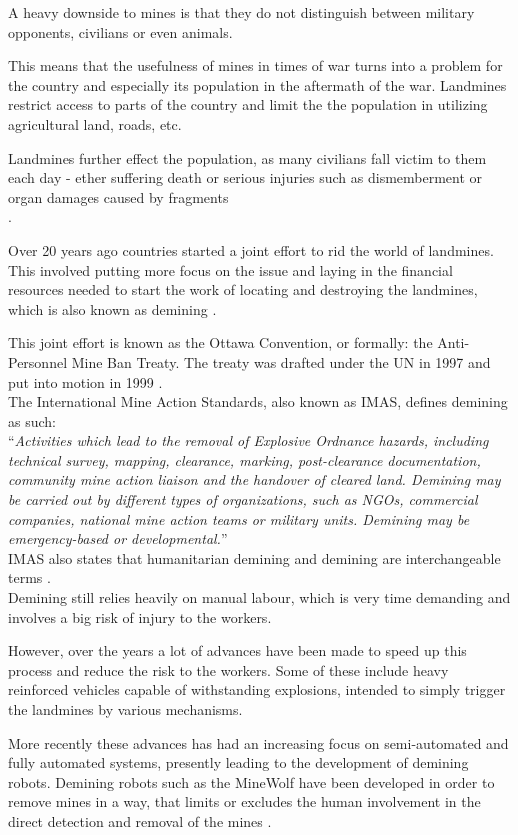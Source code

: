 A heavy downside to mines is that they do not distinguish between military opponents, civilians or even animals.

This means that the usefulness of mines in times of war turns into a problem for the country and especially its population in the aftermath of the war. Landmines restrict access to parts of the country and limit the the population in utilizing agricultural land, roads, etc.

Landmines further effect the population, as many civilians fall victim to them each day - ether suffering death or serious injuries such as dismemberment or organ damages caused by fragments  \cite{clearingTheMines}\\.

Over 20 years ago countries started a joint effort to rid the world of landmines. This involved putting more focus on the issue and laying in the financial resources needed to start the work of locating and destroying the landmines, which is also known as demining \cite{clearingTheMines}.

This joint effort is known as the Ottawa Convention, or formally: the Anti-Personnel Mine Ban Treaty. The treaty was drafted under the UN in 1997 and put into motion in 1999 \cite{treatyICBL}.\\

\noindent The International Mine Action Standards, also known as IMAS, defines demining as such:\\

“\textit{Activities which lead to the removal of Explosive Ordnance hazards, including technical survey, mapping, clearance, marking, post-clearance documentation, community mine action liaison and the handover of cleared land. Demining may be carried out by different types of organizations, such as NGOs, commercial companies, national mine action teams or military units. Demining may be emergency-based or developmental.}” \cite{IMAS}\\

\noindent IMAS also states that humanitarian demining and demining are interchangeable terms \cite{IMAS}.\\

Demining still relies heavily on manual labour, which is very time demanding and involves a big risk of injury to the workers.

However, over the years a lot of advances have been made to speed up this process and reduce the risk to the workers. Some of these include heavy reinforced vehicles capable of withstanding explosions, intended to simply trigger the landmines by various mechanisms.

More recently these advances has had an increasing focus on semi-automated and fully automated systems, presently leading to the development of demining robots. Demining robots such as the MineWolf have been developed in order to remove mines in a way, that limits or excludes the human involvement in the direct detection and removal of the mines \cite{mineWolf}.
